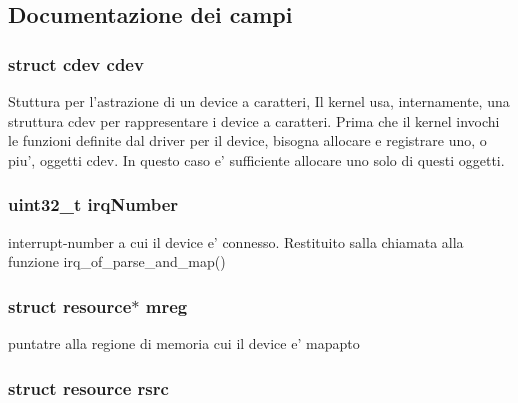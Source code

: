 \subsection{Documentazione dei campi}
\hypertarget{structmy_g_p_i_o_k__t_acba682fe45d5a1501790dbdb1d99bd6a}{
\subsubsection[{cdev}]{\setlength{\rightskip}{0pt plus 5cm}struct cdev cdev}}\label{structmy_g_p_i_o_k__t_acba682fe45d5a1501790dbdb1d99bd6a}
Stuttura per l'astrazione di un device a caratteri, Il kernel usa, internamente, una struttura cdev per rappresentare i device a caratteri. Prima che il kernel invochi le funzioni definite dal driver per il device, bisogna allocare e registrare uno, o piu', oggetti cdev. In questo caso e' sufficiente allocare uno solo di questi oggetti. \hypertarget{structmy_g_p_i_o_k__t_a42a1593ebe61611c4e29413903a373a5}{
\subsubsection[{irq\+Number}]{\setlength{\rightskip}{0pt plus 5cm}uint32\+\_\+t irq\+Number}}\label{structmy_g_p_i_o_k__t_a42a1593ebe61611c4e29413903a373a5}
interrupt-\/number a cui il device e' connesso. Restituito salla chiamata alla funzione irq\+\_\+of\+\_\+parse\+\_\+and\+\_\+map() \hypertarget{structmy_g_p_i_o_k__t_a18c4eb95350c67ccb239a8a39c43c09a}{
\subsubsection[{mreg}]{\setlength{\rightskip}{0pt plus 5cm}struct resource$\ast$ mreg}}\label{structmy_g_p_i_o_k__t_a18c4eb95350c67ccb239a8a39c43c09a}
puntatre alla regione di memoria cui il device e' mapapto \hypertarget{structmy_g_p_i_o_k__t_a565a1848c3ae8026257a74cf169c6941}{
\subsubsection[{rsrc}]{\setlength{\rightskip}{0pt plus 5cm}struct resource rsrc}}\label{structmy_g_p_i_o_k__t_a565a1848c3ae8026257a74cf169c6941}
